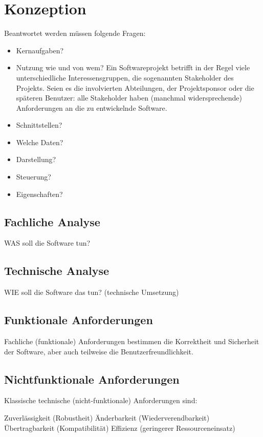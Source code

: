 \chapter{Konzeption}

Beantwortet werden müssen folgende Fragen:
\begin{itemize}
    \item Kernaufgaben?
    \item Nutzung wie und von wem? Ein Softwareprojekt betrifft in der Regel viele unterschiedliche Interessensgruppen, die sogenannten Stakeholder des Projekts.
    Seien es die involvierten Abteilungen, der Projektsponsor oder die späteren Benutzer: alle Stakeholder haben (manchmal widersprechende) Anforderungen an die zu entwickelnde Software.
    \item Schnittstellen?
    \item Welche Daten?
    \item Darstellung?
    \item Steuerung?
    \item Eigenschaften?
\end{itemize}

\section{Fachliche Analyse}

WAS soll die Software tun?

\section{Technische Analyse}

 WIE soll die Software das tun? (technische Umsetzung)

\section{Funktionale Anforderungen}

Fachliche (funktionale) Anforderungen bestimmen die Korrektheit und Sicherheit der Software, aber auch teilweise die Benutzerfreundlichkeit.

\section{Nichtfunktionale Anforderungen}

Klassische technische (nicht-funktionale) Anforderungen sind:

Zuverlässigkeit (Robustheit)
Änderbarkeit (Wiederverendbarkeit)
Übertragbarkeit (Kompatibilität)
Effizienz (geringerer Ressourceneinsatz)


